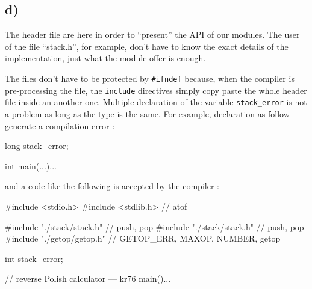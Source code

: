 \documentclass[a4paper,11pt]{report}
\begin{document}
\subsection*{d)}

The header file are here in order to ``present'' the API of our modules. The
user of the file ``stack.h'', for example, don't have to know the exact details
of the implementation, just what the module offer is enough.

The files don't have to be protected by \verb+#ifndef+ because, when the
compiler is pre-processing the file, the \verb+include+ directives simply copy
paste the whole header file inside an another one. Multiple declaration of the
variable \verb+stack_error+ is not a problem as long as the type is the same.
For example, declaration as follow generate a compilation error :

\begin{ccode}
long stack_error;

int main(...)...
\end{ccode}

and a code like the following is accepted by the compiler :

\begin{ccode}
#include <stdio.h>
#include <stdlib.h>	// atof

#include "./stack/stack.h"  // push, pop
#include "./stack/stack.h"  // push, pop
#include "./getop/getop.h"  // GETOP_ERR, MAXOP, NUMBER, getop

int stack_error;

// reverse Polish calculator --- kr76
main()...
\end{ccode}
\end{document}

